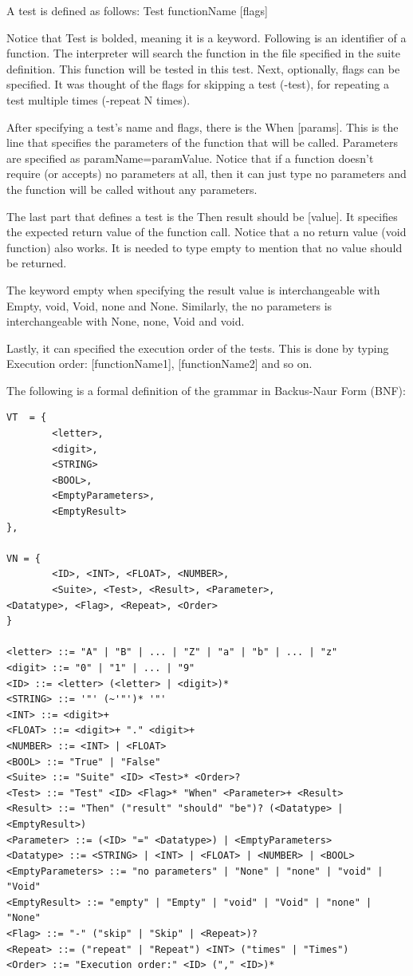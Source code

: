 A test is defined as follows:
Test functionName [flags]

Notice that Test is bolded, meaning it is a keyword. Following is an identifier of a function. The interpreter will search the function in the file specified in the suite definition. This function will be tested in this test. Next, optionally, flags can be specified. It was thought of the flags for skipping a test (-test), for repeating a test multiple times (-repeat N times). 

After specifying a test’s name and flags, there is the When [params]. This is the line that specifies the parameters of the function that will be called. Parameters are specified as paramName=paramValue. Notice that if a function doesn’t require (or accepts) no parameters at all, then it can just type no parameters and the function will be called without any parameters.

The last part that defines a test is the Then result should be [value]. It specifies the expected return value of the function call. Notice that a no return value (void function) also works. It is needed to type empty to mention that no value should be returned.

The keyword empty when specifying the result value is interchangeable with Empty, void, Void, none and None. Similarly, the no parameters is interchangeable with None, none, Void and void.

Lastly, it can specified the execution order of the tests. This is done by typing Execution order: [functionName1], [functionName2] and so on.

The following is a formal definition of the grammar in Backus-Naur Form (BNF):
\begin{verbatim}
VT  = {
		<letter>,
		<digit>,
		<STRING>
		<BOOL>,
		<EmptyParameters>,
		<EmptyResult>		
},

VN = {
		<ID>, <INT>, <FLOAT>, <NUMBER>,
		<Suite>, <Test>, <Result>, <Parameter>,
<Datatype>, <Flag>, <Repeat>, <Order>
}

<letter> ::= "A" | "B" | ... | "Z" | "a" | "b" | ... | "z"
<digit> ::= "0" | "1" | ... | "9"
<ID> ::= <letter> (<letter> | <digit>)*
<STRING> ::= '"' (~'"')* '"'
<INT> ::= <digit>+
<FLOAT> ::= <digit>+ "." <digit>+
<NUMBER> ::= <INT> | <FLOAT>
<BOOL> ::= "True" | "False"
<Suite> ::= "Suite" <ID> <Test>* <Order>?
<Test> ::= "Test" <ID> <Flag>* "When" <Parameter>+ <Result>
<Result> ::= "Then" ("result" "should" "be")? (<Datatype> | <EmptyResult>)
<Parameter> ::= (<ID> "=" <Datatype>) | <EmptyParameters>
<Datatype> ::= <STRING> | <INT> | <FLOAT> | <NUMBER> | <BOOL>
<EmptyParameters> ::= "no parameters" | "None" | "none" | "void" | "Void"
<EmptyResult> ::= "empty" | "Empty" | "void" | "Void" | "none" | "None"
<Flag> ::= "-" ("skip" | "Skip" | <Repeat>)?
<Repeat> ::= ("repeat" | "Repeat") <INT> ("times" | "Times")
<Order> ::= "Execution order:" <ID> ("," <ID>)*
\end{verbatim}

